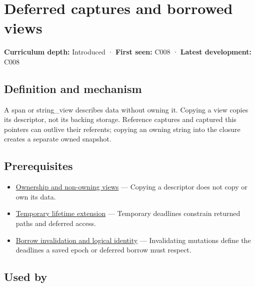 \hypertarget{appendix-aea529eb5175}{}\label{referencestart:appendix-aea529eb5175}
\section{Deferred captures and borrowed views}\label{appendix-aea529eb5175-deferred-captures-and-borrowed-views}

\textbf{Curriculum depth:} Introduced · \textbf{First seen:} C008 · \textbf{Latest development:} C008

\begin{allmightroledefinition}

\subsection{Definition and mechanism}\label{appendix-aea529eb5175-definition-and-mechanism}

A span or string\_view describes data without owning it. Copying a view copies its descriptor, not its backing storage. Reference captures and captured this pointers can outlive their referents; copying an owning string into the closure creates a separate owned snapshot.

\end{allmightroledefinition}

\subsection{Prerequisites}\label{appendix-aea529eb5175-prerequisites}

\begin{itemize}
\tightlist
\item
  \hyperref[appendix-d52e4486f527]{Ownership and non-owning views} --- Copying a descriptor does not copy or own its data.
\item
  \hyperref[appendix-a978b29bbbb0]{Temporary lifetime extension} --- Temporary deadlines constrain returned paths and deferred access.
\item
  \hyperref[appendix-f9b8b9188c7f]{Borrow invalidation and logical identity} --- Invalidating mutations define the deadlines a saved epoch or deferred borrow must respect.
\end{itemize}

\subsection{Used by}\label{appendix-aea529eb5175-used-by}

